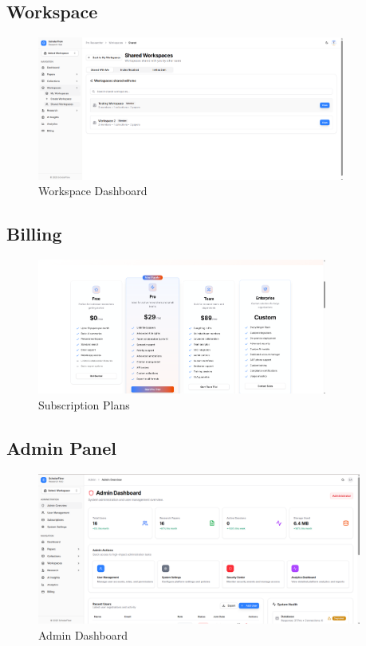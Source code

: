 \subsection{Workspace}

\begin{figure}[H]
\centering
\includegraphics[width=0.9\textwidth]{images/screenshots/shared_workspace.png}
\caption{Workspace Dashboard}
\label{fig:ss-workspace}
\end{figure}

\subsection{Billing}

\begin{figure}[H]
\centering
\includegraphics[width=0.85\textwidth]{images/screenshots/billing_plan.png}
\caption{Subscription Plans}
\label{fig:ss-billing}
\end{figure}

\subsection{Admin Panel}

\begin{figure}[H]
\centering
\includegraphics[width=0.95\textwidth]{images/screenshots/admin_overview.png}
\caption{Admin Dashboard}
\label{fig:ss-admin}
\end{figure}

